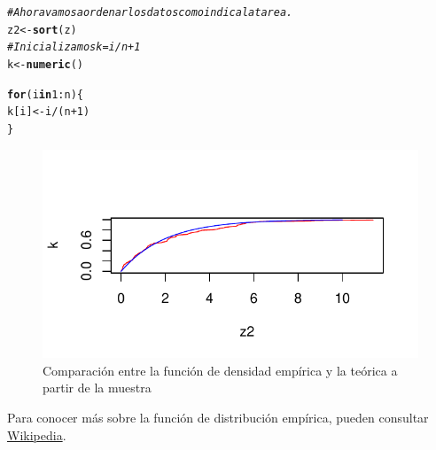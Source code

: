 \documentclass[10pt]{article}\usepackage[]{graphicx}\usepackage[]{xcolor}
\makeatletter
\def\maxwidth{ %
  \ifdim\Gin@nat@width>\linewidth
    \linewidth
  \else
    \Gin@nat@width
  \fi
}
\newcommand{\hlnum}[1]{\textcolor[rgb]{0.686,0.059,0.569}{#1}}%
\newcommand{\hlcom}[1]{\textcolor[rgb]{0.678,0.584,0.686}{\textit{#1}}}%
\newcommand{\hlopt}[1]{\textcolor[rgb]{0,0,0}{#1}}%
\newcommand{\hlstd}[1]{\textcolor[rgb]{0.345,0.345,0.345}{#1}}%
\newcommand{\hlkwa}[1]{\textcolor[rgb]{0.161,0.373,0.58}{\textbf{#1}}}%
\newcommand{\hlkwb}[1]{\textcolor[rgb]{0.69,0.353,0.396}{#1}}%
\newcommand{\hlkwd}[1]{\textcolor[rgb]{0.737,0.353,0.396}{\textbf{#1}}}%
\newenvironment{kframe}{%
 \def\at@end@of@kframe{}%
 \ifinner\ifhmode%
  \def\at@end@of@kframe{\end{minipage}}%
  \begin{minipage}{\columnwidth}%
 \fi\fi%
 \def\FrameCommand##1{\hskip\@totalleftmargin \hskip-\fboxsep
 \colorbox{shadecolor}{##1}\hskip-\fboxsep
     \hskip-\linewidth \hskip-\@totalleftmargin \hskip\columnwidth}%
 \MakeFramed {\advance\hsize-\width
   \@totalleftmargin\z@ \linewidth\hsize
   \@setminipage}}%
 {\par\unskip\endMakeFramed%
 \at@end@of@kframe}
\newenvironment{knitrout}{}{} %
\makeatother
\begin{document}
\begin{knitrout}
\color{fgcolor}\begin{kframe}
\begin{alltt}
\hlcom{#Ahora vamos a ordenar los datos como indica la tarea.}
\hlstd{z2} \hlkwb{<-} \hlkwd{sort}\hlstd{(z)}
\hlcom{# Inicializamos k =i/n+1}
\hlstd{k} \hlkwb{<-} \hlkwd{numeric}\hlstd{()}

\hlkwa{for} \hlstd{(i} \hlkwa{in} \hlnum{1}\hlopt{:}\hlstd{n) \{}
   \hlstd{k[i]} \hlkwb{<-} \hlstd{i}\hlopt{/}\hlstd{(n}\hlopt{+}\hlnum{1}\hlstd{)}
\hlstd{\}}
\end{alltt}
\end{kframe}
\end{knitrout}
\begin{knitrout}
\color{fgcolor}\begin{figure}[ht]

{\centering \includegraphics[width=\maxwidth]{figure/FDE-1} 

}

\caption[Comparación entre la función de densidad empírica y la teórica a partir de la muestra]{Comparación entre la función de densidad empírica y la teórica a partir de la muestra}\label{fig:FDE}
\end{figure}

\end{knitrout}
Para conocer más sobre la función de distribución empírica, pueden consultar \href{https://en.wikipedia.org/wiki/Empirical_distribution_function}{Wikipedia}.
\end{document}
